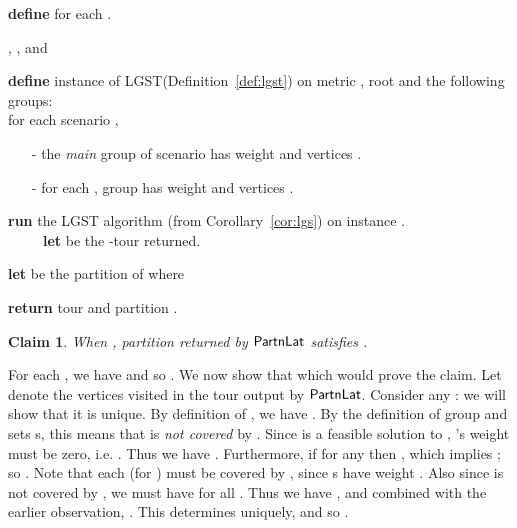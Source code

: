 \documentclass[11pt]{article}
\newtheorem{claim}[thm]{Claim}
\def\palgl{\ensuremath{{\sf PartnLat}}\xspace}
\def\lgs{{\sf LGST}\xspace}
\newenvironment{pf}{

\noindent{\bf Proof:}} {\hfill


}
\begin{document}
\begin{algorithm}[h!]
  \caption{}
  \label{alg:trppalg}
  \begin{algorithmic}[1]
    \STATE\label{step:trppalg0} {\bf define}   for each .

     , ,    and {\small }


   \STATE\label{step:trpalg1} {\bf define} instance  of \lgs (Definition~\ref{def:lgst}) 
    on metric , root  and the following groups:\\
   for each scenario ,
   \begin{itemize}
   \item[-] the \emph{main} group  
     of scenario   has weight 
     and vertices .

   \item[-] for each , group 
     has weight  and vertices .
   \end{itemize}



   \STATE\label{step:trppalg3} \textbf{run} the \lgs algorithm (from Corollary~\ref{cor:lgs}) on instance .   \\
   ~~~~~\textbf{let}  be the -tour  returned.

    \STATE \label{step:trppalg4} \textbf{let}  be the
    partition of  where
    {\small }

   \STATE \textbf{return} tour  and   partition
   .
 \end{algorithmic}
\end{algorithm}


\begin{claim}\label{cl:trp-partn}
When , partition  returned by \palgl satisfies .
\end{claim}
\begin{pf}
For each , we have  and so . We now show that  which would
prove the claim. Let  denote the vertices visited in the tour  output by \palgl.
Consider any : we will show that it is unique. By definition of , we have . By the definition of group  and sets s, this means that  is {\em not covered} by .
Since  is a feasible solution to , 's weight must be zero, i.e. . Thus we have
. Furthermore, if  for any  then , which implies
; so . Note that each  (for )
must be covered by , since s have weight . Also since  is not covered by , we must
have  for all . Thus we have , and combined with the earlier
observation, . This determines  uniquely, and so .
\end{pf}
\end{document}
